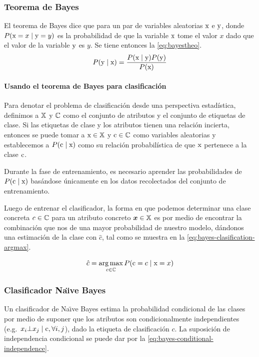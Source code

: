\subsubsection{Teorema de Bayes} \label{subsec:bayestheo}
El teorema de Bayes dice que para un par de variables aleatorias ${\textnormal{x}}$ e ${\textnormal{y}}$, donde $P({\textnormal{x}}=x \mid {\textnormal{y}}=y)$ es la probabilidad de que la variable ${\textnormal{x}}$ tome el valor $x$ dado que el valor de la variable ${\textnormal{y}}$ es $y$. Se tiene entonces la \cref{eq:bayestheo}.
\begin{equation} \label{eq:bayestheo}
  P({\textnormal{y}} \mid {\textnormal{x}}) = \frac{P({\textnormal{x}} \mid {\textnormal{y}}) P({\textnormal{y}})}{P({\textnormal{x}})}
\end{equation}

\paragraph{Usando el teorema de Bayes para clasificación}
Para denotar el problema de clasificación desde una perspectiva estadística, definimos a ${\mathbb{X}}$ y ${\mathbb{C}}$ como el conjunto de atributos y el conjunto de etiquetas de clase. Si las etiquetas de clase y los atributos tienen una relación incierta, entonces se puede tomar a ${\textnormal{x}} \in {\mathbb{X}}$ y ${\textnormal{c}} \in {\mathbb{C}}$ como variables aleatorias y establecemos a $P({\textnormal{c}} \mid {\textnormal{x}})$ como su relación probabilística de que ${\textnormal{x}}$ pertenece a la clase ${\textnormal{c}}$.

Durante la fase de entrenamiento, es necesario aprender las probabilidades de $P({\textnormal{c}} \mid {\textnormal{x}})$ basándose únicamente en los datos recolectados del conjunto de entrenamiento.

Luego de entrenar el clasificador, la forma en que podemos determinar una clase concreta $c \in {\mathbb{C}}$ para un atributo concreto ${\bm{x}} \in {\mathbb{X}}$ es por medio de encontrar la combinación que nos de una mayor probabilidad de nuestro modelo, dándonos una estimación de la clase con $\hat{c}$, tal como se muestra en la \cref{eq:bayes-clasification-argmax}.

\begin{equation} \label{eq:bayes-clasification-argmax}
  \hat{c} = \operatorname*{arg\,max}_{c\in{\mathbb{C}}} P({\textnormal{c}} = c \mid {\textnormal{x}} = x)
\end{equation}

\subsubsection{Clasificador Na\"{\i}ve Bayes} \label{subsec:naivebayes}
Un clasificador de Na\"{\i}ve Bayes estima la probabilidad condicional de las clases por medio de suponer que los atributos son condicionalmente independientes \mbox{(e.g. $x_i \bot x_j \mid {\textnormal{c}}, \forall i, j$)}, dado la etiqueta de clasificación $c$. La suposición de independencia condicional se puede dar por la \cref{eq:bayes-conditional-independence}.

